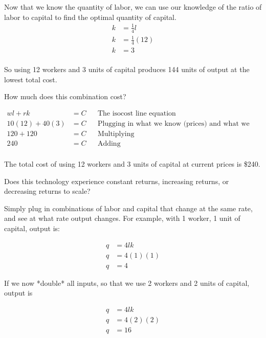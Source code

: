 \documentclass[12 pt]{exam}
\begin{document}
\begin{questions}
\begin{solution}
Now that we know the quantity of labor, we can use our knowledge of the ratio of labor to capital to find the optimal quantity of capital. 
\begin{align*}
k&=\frac{1}{4}l\\
k&=\frac{1}{4}(12)\\
k&=3\\ 	
\end{align*}

So using 12 workers and 3 units of capital produces 144 units of output at the lowest total cost.
\end{solution}

\question How much does this combination cost?

\begin{solution}

\begin{align*}
wl+rk&=C && \text{The isocost line equation}\\
10(12)+40(3)&=C && \text{Plugging in what we know (prices) and what we found}\\
120+120&=C && \text{Multiplying}\\
240&=C && \text{Adding}\\
\end{align*}

The total cost of using 12 workers and 3 units of capital at current prices is \$240.

\end{solution}

\question Does this technology experience constant returns, increasing returns, or decreasing returns to scale?

\begin{solution}

Simply plug in combinations of labor and capital that change at the same rate, and see at what rate output changes. For example, with 1 worker, 1 unit of capital, output is:

\begin{align*}
q&=4lk\\
q&=4(1)(1)\\
q&=4
\end{align*}

If we now *double* all inputs, so that we use 2 workers and 2 units of capital, output is

\begin{align*}
q&=4lk\\
q&=4(2)(2)\\
q&=16
\end{align*}


\end{solution}
\end{questions}
\end{document}

